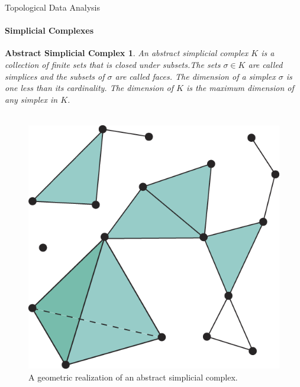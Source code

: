 \documentclass[pdf]{beamer}
\begin{document}
    \begin{frame}{Topological Data Analysis}
        \framesubtitle{Simplicial Complexes}
        \newtheorem{defn:complex}{Abstract Simplicial Complex}

        \begin{defn:complex}
            An {\color{red} abstract simplicial complex} $K$ is a collection of finite sets that is closed under
            subsets.The sets $\sigma \in K$ are called {\color{red} simplices} and the subsets of $\sigma$ are 
            called {\color {red} faces}. The {\color{red} dimension} of a simplex $\sigma$ is one less than
            its cardinality. The {\color{red} dimension} of $K$ is the maximum dimension of any simplex in $K$. \\~\\
        \end{defn:complex}

        \begin{figure}
            \centering
            \includegraphics[scale=0.4]{simp_comp.png}
            \caption{A geometric realization of an abstract simplicial complex.}
        \end{figure}
    \end{frame}
\end{document}
